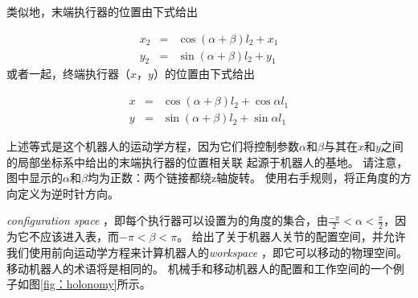 类似地，末端执行器的位置由下式给出

\begin{eqnarray}
x_2&=&\cos(\alpha+\beta)l_2+x_1\\
y_2&=&\sin(\alpha+\beta)l_2+y_1
\end{eqnarray}
%
或者一起，终端执行器$（x，y）$的位置由下式给出

\begin{eqnarray}\label{eq:cosx}
x&=&\cos(\alpha+\beta)l_2+\cos\alpha l_1\\
y&=&\sin(\alpha+\beta)l_2+\sin\alpha l_1
\end{eqnarray}


上述等式是这个机器人的运动学方程，因为它们将控制参数$ \alpha $和$ \beta $与其在$ x $和$ y $之间的局部坐标系中给出的末端执行器的位置相关联 起源于机器人的基地。 请注意，图中显示的$ \alpha $和$ \beta $均为正数：两个链接都绕z轴旋转。 使用右手规则，将正角度的方向定义为逆时针方向。


\emph {configuration space}  ，即每个执行器可以设置为的角度的集合，由$ \frac { - \pi} {2} <\alpha <\frac {\pi} {2} $，因为它不应该进入表，而$ - \pi <\beta <\pi $。 给出了关于机器人关节的配置空间，并允许我们使用前向运动学方程来计算机器人的\emph {workspace} ，即它可以移动的物理空间。 移动机器人的术语将是相同的。 机械手和移动机器人的配置和工作空间的一个例子如图\ref {fig：holonomy}所示。

